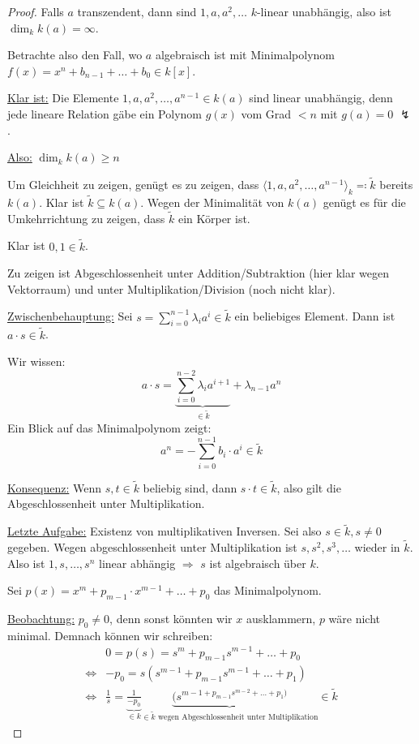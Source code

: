 \documentclass[a4paper,12pt,numbers=noenddot,parskip=full]{scrartcl}
\newcommand{\heading}{\underline}
\theoremstyle{dotless}
\theoremstyle{remark}
\begin{document}
	\begin{proof}
		Falls $a$ transzendent, dann sind $1,a,a^2,\dots$ $k$-linear unabhängig, also ist $\dim_k k(a) = \infty$.
		
		Betrachte also den Fall, wo $a$ algebraisch ist mit Minimalpolynom $f(x) = x^n + b_{n-1} + \dots + b_0 \in k[x]$.
		
		\heading{Klar ist:} Die Elemente $1,a,a^2, \dots, a^{n-1} \in k(a)$ sind linear unabhängig, denn jede lineare Relation gäbe ein Polynom $g(x)$ vom Grad $< n$ mit $g(a) = 0$ $\lightning$.
		
		\heading{Also:} $\dim_k k(a) \geq n$
		
		Um Gleichheit zu zeigen, genügt es zu zeigen, dass $\langle 1, a, a^2, \dots, a^{n-1} \rangle_k \eqqcolon \tilde{k}$ bereits $k(a)$. Klar ist $\tilde{k} \subseteq k(a)$. Wegen der Minimalität von $k(a)$ genügt es für die Umkehrrichtung zu zeigen, dass $\tilde{k}$ ein Körper ist.
		
		Klar ist $0,1 \in \tilde{k}$.
		
		Zu zeigen ist Abgeschlossenheit unter Addition/Subtraktion (hier klar wegen Vektorraum) und unter Multiplikation/Division (noch nicht klar).
		
		\heading{Zwischenbehauptung:} Sei $s = \sum_{i=0}^{n-1} \lambda_i a^i \in \tilde{k}$ ein beliebiges Element. Dann ist $a \cdot s \in \tilde{k}$.
		
		Wir wissen:
		\begin{equation*}
			a \cdot s = \underbrace{\sum_{i=0}^{n-2} \lambda_i a^{i+1}}_{\in \tilde{k}} + \lambda_{n-1} a^n
		\end{equation*}
		Ein Blick auf das Minimalpolynom zeigt:
		\begin{equation*}
			a^n = - \sum_{i = 0}^{n-1} b_i \cdot a^i \in \tilde{k}
		\end{equation*}
		
		\heading{Konsequenz:} Wenn $s,t \in \tilde{k}$ beliebig sind, dann $s \cdot t \in \tilde{k}$, also gilt die Abgeschlossenheit unter Multiplikation.
		
		\heading{Letzte Aufgabe:} Existenz von multiplikativen Inversen. Sei also $s \in \tilde{k}, s \neq 0$ gegeben. Wegen abgeschlossenheit unter Multiplikation ist $s, s^2, s^3, \dots$ wieder in $\tilde{k}$. Also ist $1,s, \dots, s^n$ linear abhängig $\Rightarrow$ $s$ ist algebraisch über $k$.
		
		Sei $p(x) = x^m + p_{m-1} \cdot x^{m-1} + \dots + p_0$ das Minimalpolynom.
		
		\heading{Beobachtung:} $p_0 \neq 0$, denn sonst könnten wir $x$ ausklammern, $p$ wäre nicht minimal. Demnach können wir schreiben:
		\begin{align*}
			&0 = p(s) = s^m + p_{m-1} s^{m-1} + \dots + p_0 \\
			\Leftrightarrow& - p_0 = s(s^{m-1} + p_{m-1} s^{m-1} + \dots + p_1) \\
			\Leftrightarrow& \frac{1}{s} = \underbrace{\frac{1}{-p_0}}_{\in k} \underbrace{(s^{m-1 + p_{m-1} s^{m-2} + \dots + p_1)}}_{\in \tilde{k} \text{ wegen Abgeschlossenheit unter Multiplikation}} \in \tilde{k}
		\end{align*}
	\end{proof}
\end{document}
